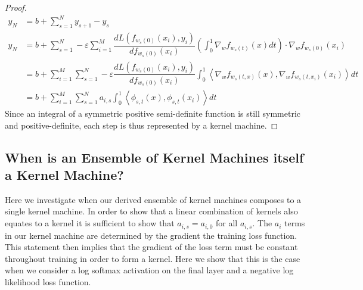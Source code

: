 \begin{proof}
\begin{align*}
y_N &= b + \sum_{s=1}^N y_{s+1} - y_s\\
y_N &= b + \sum_{s = 1}^N -\varepsilon \sum_{i = 1}^{M} \dfrac{d L(f_{w_s(0)}(x_i),  y_i)}{d f_{w_s(0)}(x_i)}  \left(\int_0^1\nabla_w f_{w_s(t)}(x)dt\right) \cdot \nabla_w f_{w_s(0)}(x_i)\\
&= b + \sum_{i = 1}^{M}\sum_{s = 1}^N -\varepsilon  \dfrac{d L(f_{w_s(0)}(x_i),  y_i)}{d f_{w_s(0)}(x_i)}  \int_0^1\left\langle \nabla_w f_{w_s(t,x)}(x), \nabla_w f_{w_s(t,x_i)}(x_i) \right\rangle dt\\ 
&= b + \sum_{i = 1}^{M}\sum_{s = 1}^N a_{i, s}  \int_0^1 \left\langle \phi_{s,t}(x), \phi_{s,t}(x_i)\right\rangle dt
\end{align*}
Since an integral of a symmetric positive semi-definite function is still symmetric and positive-definite, each step is thus represented by a kernel machine. 

\end{proof}
\subsection{When is an Ensemble of Kernel Machines itself a Kernel Machine?}
\label{proof:ekmr}
Here we investigate when our derived ensemble of kernel machines composes to a single kernel machine.
In order to show that a linear combination of kernels also equates to a kernel it is sufficient to show that $a_{i,s} = a_{i,0}$ for all $a_{i,s}$.
The $a_{i}$ terms in our kernel machine are determined by the gradient the training loss function.
This statement then implies that the gradient of the loss term must be constant throughout training in order to form a kernel.
Here we show that this is the case when we consider a log softmax activation on the final layer and a negative log likelihood loss function.


